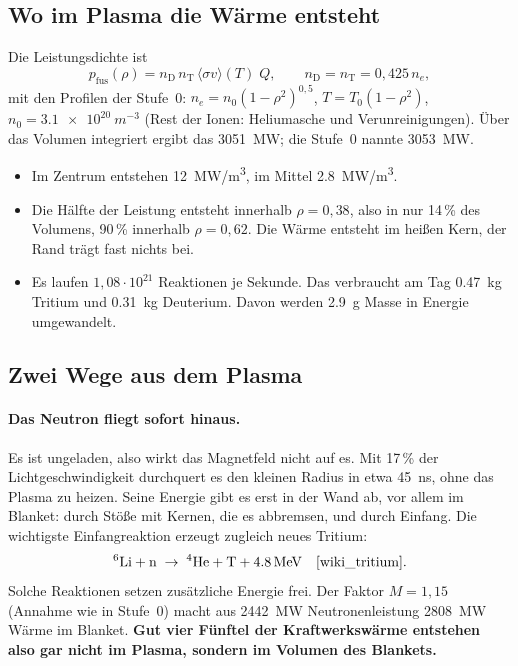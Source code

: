 \subsection{Wo im Plasma die Wärme entsteht}
Die Leistungsdichte ist
\[ p_\mathrm{fus}(\rho) = n_\mathrm{D}\,n_\mathrm{T}\,\langle\sigma v\rangle(T)\;Q,\qquad
   n_\mathrm{D} = n_\mathrm{T} = 0{,}425\,n_e, \]
mit den Profilen der Stufe~0: $n_e = n_0(1-\rho^2)^{0{,}5}$, $T = T_0(1-\rho^2)$, $n_0 = \SI{3,1e20}{m^{-3}}$
(Rest der Ionen: Heliumasche und Verunreinigungen). Über das Volumen integriert ergibt das \SI{3051}{MW}; die Stufe~0
nannte \SI{3053}{MW}.
\begin{itemize}
\item Im Zentrum entstehen \SI{12}{MW/m^3}, im Mittel \SI{2,8}{MW/m^3}.
\item Die Hälfte der Leistung entsteht innerhalb $\rho = 0{,}38$, also in nur 14\,\% des Volumens, 90\,\% innerhalb
  $\rho = 0{,}62$. Die Wärme entsteht im heißen Kern, der Rand trägt fast nichts bei.
\item Es laufen $1{,}08\cdot10^{21}$ Reaktionen je Sekunde. Das verbraucht am Tag \SI{0,47}{kg} Tritium und
  \SI{0,31}{kg} Deuterium. Davon werden \SI{2,9}{g} Masse in Energie umgewandelt.
\end{itemize}

\subsection{Zwei Wege aus dem Plasma}
\paragraph{Das Neutron fliegt sofort hinaus.} Es ist ungeladen, also wirkt das Magnetfeld nicht auf es. Mit 17\,\% der
Lichtgeschwindigkeit durchquert es den kleinen Radius in etwa \SI{45}{ns}, ohne das Plasma zu heizen. Seine Energie
gibt es erst in der Wand ab, vor allem im Blanket: durch Stöße mit Kernen, die es abbremsen, und durch Einfang. Die
wichtigste Einfangreaktion erzeugt zugleich neues Tritium:
\[ {}^6\mathrm{Li} + \mathrm{n} \;\rightarrow\; {}^4\mathrm{He} + \mathrm{T} + \SI{4,8}{MeV} \quad\text{\cite{wiki_tritium}}. \]
Solche Reaktionen setzen zusätzliche Energie frei. Der Faktor $M = 1{,}15$ (Annahme wie in Stufe~0) macht aus
\SI{2442}{MW} Neutronenleistung \SI{2808}{MW} Wärme im Blanket. \textbf{Gut vier Fünftel der Kraftwerkswärme
entstehen also gar nicht im Plasma, sondern im Volumen des Blankets.}

